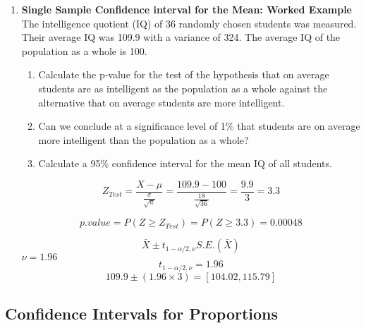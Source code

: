 \documentclass[]{report}
\begin{document}
\begin{enumerate}
	
	\item \textbf{Single Sample Confidence interval for the Mean: Worked Example}\\
	
	The intelligence quotient (IQ) of 36 randomly chosen students was measured.
	Their average IQ was 109.9 with a variance of 324.
	The average IQ of the population as a whole is 100.
	
	\begin{enumerate}
		\item Calculate the p-value for the test of the hypothesis that on average
		students are as intelligent as the population as a whole against the alternative that on average students are more intelligent.
		
		
		\item Can we conclude at a significance level of 1\% that students are on average more intelligent than the population as a whole?
		
		\item Calculate a 95\% confidence interval for the mean IQ of all students.
		
	\end{enumerate}
	
	\begin{equation}
	Z_{Test} = \frac{X- \mu}{\frac{\sigma}{\sqrt{n}}} = \frac{109.9 - 100}{\frac{18}{\sqrt{36}}} = \frac{9.9}{3} = 3.3
	\end{equation}
	
	
	\begin{equation}
	p.value = P(Z \geq Z_{Test}) = P(Z \geq 3.3) = 0.00048
	\end{equation}
	
	
	
	\begin{equation}
	\bar{X} \pm t_{1-\alpha/2,\nu}S.E.(\bar{X})
	\end{equation}
	$\nu = 1.96$
	\begin{equation}
	t_{1-\alpha/2,\nu} = 1.96
	\end{equation}
	\begin{equation}
	109.9 \pm (1.96 \times 3) = [104.02, 115.79]
	\end{equation}
	
	
	
\end{enumerate}

\subsection{Confidence Intervals for Proportions}
\end{document}
